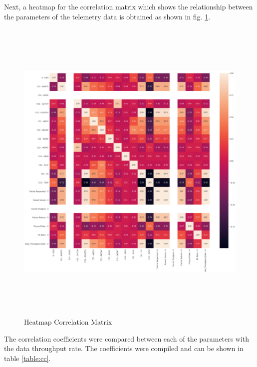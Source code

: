 Next, a heatmap for the correlation matrix which shows the relationship between the parameters of the telemetry data is obtained as shown in fig. \ref{fig_Cmatrix}. 

\begin{figure}[ht]
    \centering
    \includegraphics[width=14.5cm,height=15.2cm,keepaspectratio]{pages/Chapter4/Chapter 4 Images/Cmatrix.PNG}
    \caption{Heatmap Correlation Matrix}
    \label{fig_Cmatrix}
\end{figure}

The correlation coefficients were compared between each of the parameters with the data throughput rate. The coefficients were compiled and can be shown in table \ref{table:cc}. 

